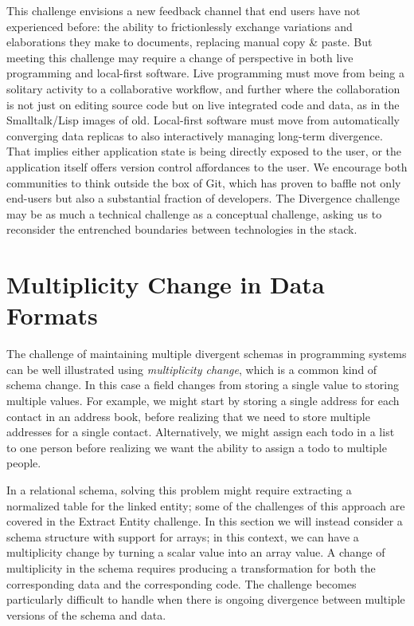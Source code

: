 \documentclass[english,submission]{programming}
\begin{document}
This challenge envisions a new feedback channel that end users have not experienced before: the ability to frictionlessly exchange variations and elaborations they make to documents, replacing manual copy \& paste. But meeting this challenge may require a  change of perspective in both live programming and local-first software.
Live programming must move from being a solitary activity to a collaborative workflow, and further where the collaboration is not just on editing source code but on live integrated code and data,
as in the Smalltalk/Lisp images of old.
Local-first software must move from automatically converging data replicas
to also interactively managing long-term divergence. That implies either application state
is being directly exposed to the user, or the application itself offers
version control affordances to the user. We encourage both communities to think outside the box of Git,
which has proven to baffle not only end-users but also a substantial fraction of developers. The Divergence challenge may be as much a technical challenge as a conceptual challenge, asking us to reconsider the entrenched boundaries between technologies in the stack.


\section{Multiplicity Change in Data Formats}

The challenge of maintaining multiple divergent schemas in programming systems can
be well illustrated using \emph{multiplicity change}, which is a common kind of schema change.
In this case a field changes from storing
a single value to storing multiple values. For example, we might start by storing a single
address for each contact in an address book, before realizing that we need to store multiple
addresses for a single contact. Alternatively, we might assign each todo in a list to one person before
realizing we want the ability to assign a todo to multiple people.

In a relational schema, solving this problem might require extracting a normalized table for
the linked entity; some of the challenges of this approach are covered in the Extract Entity
challenge. In this section we will instead consider a schema structure with support for arrays;
in this context, we can have a multiplicity change by turning a scalar value into an array value.
%
A change of multiplicity in the schema requires producing a transformation for both the corresponding
data and the corresponding code. The challenge becomes particularly difficult to handle when there
is ongoing divergence between multiple versions of the schema and data.
\end{document}
